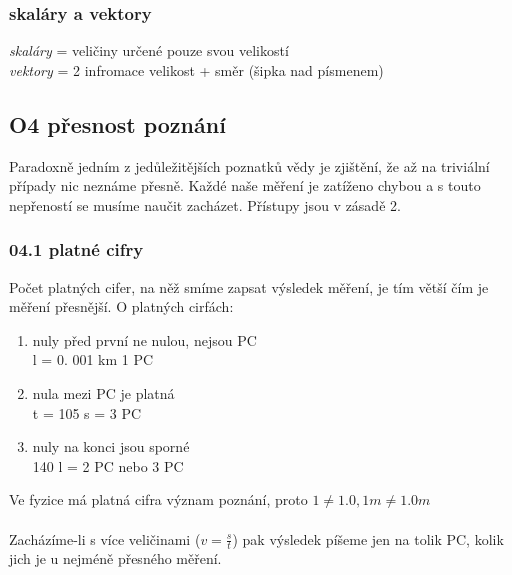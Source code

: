 \documentclass{article}
\begin{document}
\subsubsection*{skaláry a vektory}
\emph{skaláry} = veličiny určené pouze svou velikostí \\
\emph{vektory} = 2 infromace velikost + směr (šipka nad písmenem)

\subsection*{O4 přesnost poznání}
Paradoxně jedním z jedůležitějších poznatků vědy je zjištění, že až na triviální případy nic neznáme přesně. Každé naše měření je zatíženo chybou a  s touto nepřeností se musíme naučit zacházet. Přístupy jsou v zásadě 2.
\subsubsection*{04.1 platné cifry}
Počet platných cifer, na něž smíme zapsat výsledek měření, je tím větší čím je měření přesnější. O platných cirfách: \\
\begin{enumerate}
    \item nuly před první ne nulou, nejsou PC \\
        l = 0. 001 km 1 PC \\
    \item nula mezi PC je platná \\
        t = 105 s = 3 PC \\
    \item nuly na konci jsou sporné \\
        140 l = 2 PC nebo 3 PC \\
\end{enumerate}
Ve fyzice má platná cifra význam poznání, proto $1 \neq 1.0, 1 m \neq 1.0 m$ \\\\
Zacházíme-li s více veličinami ($v = \frac{s}{t}$) pak výsledek píšeme jen na tolik PC, kolik jich je u nejméně přesného měření. 
\end{document}
